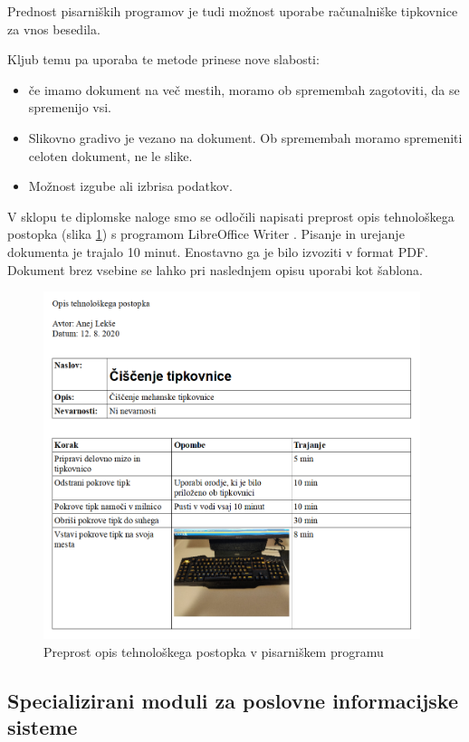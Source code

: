 \documentclass[a4paper, 12pt]{book}
\begin{document}
Prednost pisarniških programov je tudi možnost uporabe računalniške tipkovnice za vnos besedila.

Kljub temu pa uporaba te metode prinese nove slabosti:
\begin{itemize}
	\item če imamo dokument na več mestih, moramo ob spremembah zagotoviti, da se spremenijo vsi.
	\item Slikovno gradivo je vezano na dokument. Ob spremembah moramo spremeniti celoten dokument, ne le slike.
	\item Možnost izgube ali izbrisa podatkov.
\end{itemize}

V sklopu te diplomske naloge smo se odločili napisati preprost opis tehnološkega postopka (slika \ref{report_writer}) s programom LibreOffice Writer \cite{writer}.
Pisanje in urejanje dokumenta je trajalo 10 minut.
Enostavno ga je bilo izvoziti v format PDF.
Dokument brez vsebine se lahko pri naslednjem opisu uporabi kot šablona.

\begin{figure}[H]
\begin{center}
\includegraphics[width=11cm]{report_writer}
\end{center}
\caption{Preprost opis tehnološkega postopka v pisarniškem programu}
\label{report_writer}
\end{figure}

\subsection{Specializirani moduli za poslovne informacijske sisteme}
\end{document}
